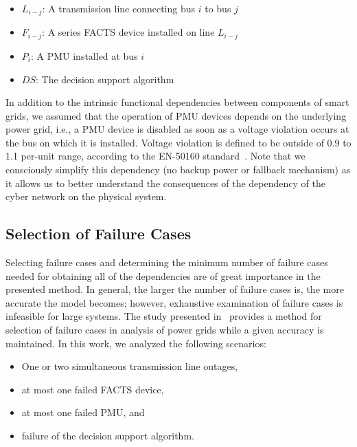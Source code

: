 \documentclass[12pt]{elsarticle}
\begin{document}
\begin{itemize}
  \item $L_{i-j}$: A transmission line connecting bus $i$ to bus $j$
  \item $F_{i-j}$: A series FACTS device installed on line $L_{i-j}$
  \item $P_i$: A PMU installed at bus $i$
  \item $DS$: The decision support algorithm
\end{itemize}

In addition to the intrinsic functional dependencies between components of smart grids, we assumed that the operation of PMU devices depends on the underlying power grid, i.e., a PMU device is disabled as soon as a voltage violation occurs at the bus on which it is installed. Voltage violation is defined to be outside of 0.9 to 1.1 per-unit range, according to the EN-50160 standard~\cite{EN50160}. Note that we consciously simplify this dependency (no backup power or fallback mechanism) as it allows us to better understand the consequences of the dependency of the cyber network on the physical system.

\subsection{Selection of Failure Cases}
\label{sec:case_study:selection}
Selecting failure cases and determining the minimum number of failure cases needed for obtaining all of the dependencies are of great importance in the presented method. In general, the larger the number of failure cases is, the more accurate the model becomes; however, exhaustive examination of failure cases is infeasible for large systems. The study presented in~\cite{QiS15} provides a method for selection of failure cases in analysis of power grids while a given accuracy is maintained. In this work, we analyzed the following scenarios:

\begin{itemize}
  \item One or two simultaneous transmission line outages,
  \item at most one failed FACTS device,
  \item at most one failed PMU, and
  \item failure of the decision support algorithm.
\end{itemize}
\end{document}
